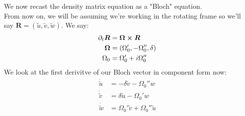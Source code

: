 We now recast the density matrix equation as a "Bloch" equation. \\
From now on, we will be assuming we're working in the rotating frame so we'll say $\bm{R} = (\tilde{u},\tilde{v},\tilde{w})$. We say:
\begin{align*}
	\partial_t \bm{R} &= \bm{\Omega} \cross \bm{R} \\
	\bm{\Omega} &= (\Omega_0',-\Omega_0'',\delta) \\
	\Omega_0 &= \Omega_0' + i\Omega_0''
\end{align*}
We look at the first derivitve of our Bloch vector in component form now:
\begin{align*}
	\dot{\tilde{u}} &= -\delta\tilde{v} - \Omega_0''w \\
	\dot{\tilde{v}} &= \delta \tilde{u} - \Omega_0' w \\
	\dot{\tilde{w}} &= \Omega_0' \tilde{v} + \Omega_0''\tilde{u}
\end{align*}
